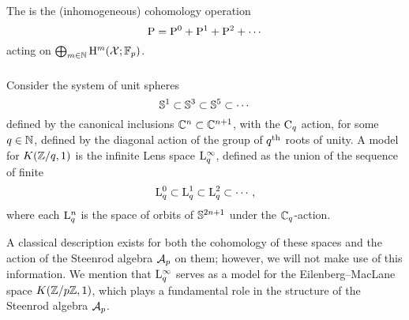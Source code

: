 
The  is the (inhomogeneous) cohomology operation
\[
\mathrm{P} = \mathrm{P}^0 + \mathrm{P}^1 + \mathrm{P}^2 + \dotsb
\]
acting on \(\bigoplus_{m \in \mathbb{N}} \mathrm{H}^m(\mathcal{X}; {\mathbb{F}_p})\).

\subsubsection{}\label{sss:cohomology_lens}

Consider the system of unit spheres
\[
\mathbb{S}^1 \subset \mathbb{S}^3 \subset \mathbb{S}^5 \subset \dotsb
\]
defined by the canonical inclusions \(\mathbb{C}^n \subset \mathbb{C}^{n+1}\), with the \(\mathrm{C}_q\) action, for some \(q \in \mathbb{N}\), defined by the diagonal action of the group of \(q^{\mathrm{th}}\) roots of unity.
A model for \(K(\mathbb{Z}/q,1)\) is the infinite Lens space \(\mathrm{L}^\infty_q\), defined as the union of the sequence of finite   
\[
\mathrm{L}^0_q \subset \mathrm{L}^1_q \subset \mathrm{L}^2_q \subset \dotsb,
\]  
where each \(\mathrm{L}^n_q\) is the space of orbits of \(\mathbb{S}^{2n+1}\) under the \(\mathbb{C}_q\)-action.

A classical description exists for both the cohomology of these spaces and the action of the Steenrod algebra $\mathcal{A}_p$ on them; however, we will not make use of this information.
We mention that $\mathrm{L}^\infty_q$ serves as a model for the Eilenberg--MacLane space $K(\mathbb{Z}/p\mathbb{Z}, 1)$, which plays a fundamental role in the structure of the Steenrod algebra \(\mathcal{A}_p\).


